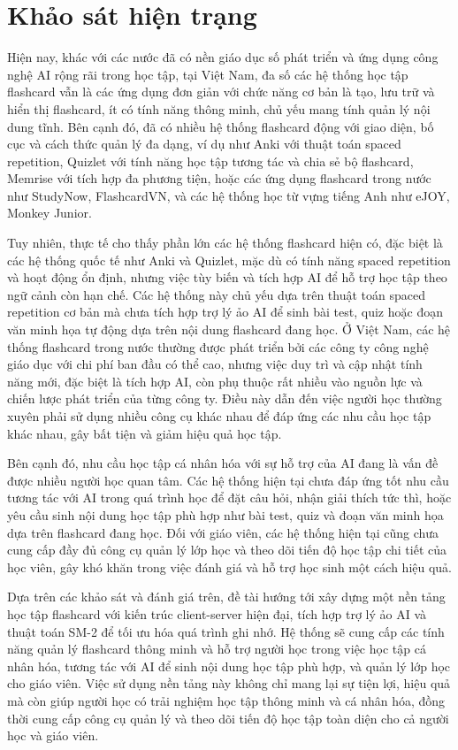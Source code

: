 \documentclass[../DoAn.tex]{subfiles}
\begin{document}
\section{Khảo sát hiện trạng}
\label{section:1.1}
Hiện nay, khác với các nước đã có nền giáo dục số phát triển và ứng dụng công nghệ AI rộng rãi trong học tập, tại Việt Nam, đa số các hệ thống học tập flashcard vẫn là các ứng dụng đơn giản với chức năng cơ bản là tạo, lưu trữ và hiển thị flashcard, ít có tính năng thông minh, chủ yếu mang tính quản lý nội dung tĩnh. Bên cạnh đó, đã có nhiều hệ thống flashcard động với giao diện, bố cục và cách thức quản lý đa dạng, ví dụ như Anki với thuật toán spaced repetition, Quizlet với tính năng học tập tương tác và chia sẻ bộ flashcard, Memrise với tích hợp đa phương tiện, hoặc các ứng dụng flashcard trong nước như StudyNow, FlashcardVN, và các hệ thống học từ vựng tiếng Anh như eJOY, Monkey Junior.

Tuy nhiên, thực tế cho thấy phần lớn các hệ thống flashcard hiện có, đặc biệt là các hệ thống quốc tế như Anki và Quizlet, mặc dù có tính năng spaced repetition và hoạt động ổn định, nhưng việc tùy biến và tích hợp AI để hỗ trợ học tập theo ngữ cảnh còn hạn chế. Các hệ thống này chủ yếu dựa trên thuật toán spaced repetition cơ bản mà chưa tích hợp trợ lý ảo AI để sinh bài test, quiz hoặc đoạn văn minh họa tự động dựa trên nội dung flashcard đang học. Ở Việt Nam, các hệ thống flashcard trong nước thường được phát triển bởi các công ty công nghệ giáo dục với chi phí ban đầu có thể cao, nhưng việc duy trì và cập nhật tính năng mới, đặc biệt là tích hợp AI, còn phụ thuộc rất nhiều vào nguồn lực và chiến lược phát triển của từng công ty. Điều này dẫn đến việc người học thường xuyên phải sử dụng nhiều công cụ khác nhau để đáp ứng các nhu cầu học tập khác nhau, gây bất tiện và giảm hiệu quả học tập.

Bên cạnh đó, nhu cầu học tập cá nhân hóa với sự hỗ trợ của AI đang là vấn đề được nhiều người học quan tâm. Các hệ thống hiện tại chưa đáp ứng tốt nhu cầu tương tác với AI trong quá trình học để đặt câu hỏi, nhận giải thích tức thì, hoặc yêu cầu sinh nội dung học tập phù hợp như bài test, quiz và đoạn văn minh họa dựa trên flashcard đang học. Đối với giáo viên, các hệ thống hiện tại cũng chưa cung cấp đầy đủ công cụ quản lý lớp học và theo dõi tiến độ học tập chi tiết của học viên, gây khó khăn trong việc đánh giá và hỗ trợ học sinh một cách hiệu quả.

Dựa trên các khảo sát và đánh giá trên, đề tài hướng tới xây dựng một nền tảng học tập flashcard với kiến trúc client-server hiện đại, tích hợp trợ lý ảo AI và thuật toán SM-2 để tối ưu hóa quá trình ghi nhớ. Hệ thống sẽ cung cấp các tính năng quản lý flashcard thông minh và hỗ trợ người học trong việc học tập cá nhân hóa, tương tác với AI để sinh nội dung học tập phù hợp, và quản lý lớp học cho giáo viên. Việc sử dụng nền tảng này không chỉ mang lại sự tiện lợi, hiệu quả mà còn giúp người học có trải nghiệm học tập thông minh và cá nhân hóa, đồng thời cung cấp công cụ quản lý và theo dõi tiến độ học tập toàn diện cho cả người học và giáo viên.
\end{document}
